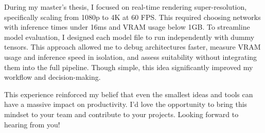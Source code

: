 \documentclass[11pt, a4paper]{awesome-cv}
\begin{document}
\begin{cvletter}

During my master’s thesis, I focused on real-time rendering super-resolution, 
specifically scaling from 1080p to 4K at 60 FPS. 
This required choosing networks with inference times under 16ms and VRAM usage below 1GB.
To streamline model evaluation, 
I designed each model file to run independently with dummy tensors. 
This approach allowed me to debug architectures faster, measure VRAM usage and inference speed in isolation, 
and assess suitability without integrating them into the full pipeline. 
Though simple, this idea significantly improved my workflow and decision-making.

This experience reinforced my belief that even the smallest ideas and tools can have a massive impact on productivity. 
I’d love the opportunity to bring this mindset to your team and contribute to your projects. 
Looking forward to hearing from you!
\end{cvletter}


\makeletterclosing
\end{document}
